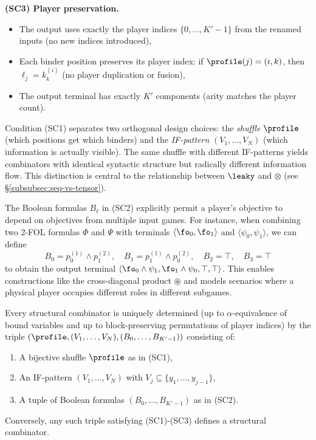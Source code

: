 \begin{definition}
\smallskip
\noindent\textbf{(SC3) Player preservation.}
\begin{itemize}[nosep]
  \item The output uses exactly the player indices $\{0, \ldots, K'-1\}$ from 
    the renamed inputs (no new indices introduced),
  \item Each binder position preserves its player index: if $\profile(j) = (i, k)$, 
    then $\ell_j = k_k^{(i)}$ (no player duplication or fusion),
  \item The output terminal has exactly $K'$ components (arity matches the player count).
\end{itemize}
\end{definition}

\begin{remark}
Condition (SC1) separates two orthogonal design choices: the \emph{shuffle} 
$\profile$ (which positions get which binders) and the \emph{IF-pattern} 
$(V_1, \ldots, V_N)$ (which information is actually visible). 
The same shuffle with different IF-patterns yields combinators with 
identical syntactic structure but radically different information flow. 
This distinction is central to the relationship between $\leaky$ and $\otimes$ 
(see \S\ref{subsubsec:seq-vs-tensor}).
\end{remark}

\begin{remark}
The Boolean formulas $B_\ell$ in (SC2) explicitly permit a player's objective 
to depend on objectives from multiple input games. 
For instance, when combining two 2-FOL formulas $\Phi$ and $\Psi$ with 
terminals $\langle\fo_0, \fo_1\rangle$ and $\langle\psi_0, \psi_1\rangle$, 
we can define 
\[
B_0 = p^{(1)}_0 \wedge p^{(2)}_1, \quad
B_1 = p^{(1)}_1 \wedge p^{(2)}_0, \quad
B_2 = \top, \quad
B_3 = \top
\]
to obtain the output terminal
$\langle \fo_0 \wedge \psi_1, \fo_1 \wedge \psi_0, \top, \top \rangle$. 
This enables constructions like the cross-diagonal product $\circledast$ 
and models scenarios where a physical player occupies different roles in 
different subgames.
\end{remark}

\begin{lemma}
\label{lem:combinator-normal-form}
Every structural combinator is uniquely determined (up to $\alpha$-equivalence 
of bound variables and up to block-preserving permutations of player indices) 
by the triple $(\profile, (V_1, \ldots, V_N), (B_0, \ldots, B_{K'-1}))$ consisting of:
\begin{enumerate}[nosep]
  \item A bijective shuffle $\profile$ as in (SC1),
  \item An IF-pattern $(V_1, \ldots, V_N)$ with $V_j \subseteq \{y_1, \ldots, y_{j-1}\}$,
  \item A tuple of Boolean formulas $(B_0, \ldots, B_{K'-1})$ as in (SC2).
\end{enumerate}
Conversely, any such triple satisfying (SC1)-(SC3) defines a structural combinator.
\end{lemma}

